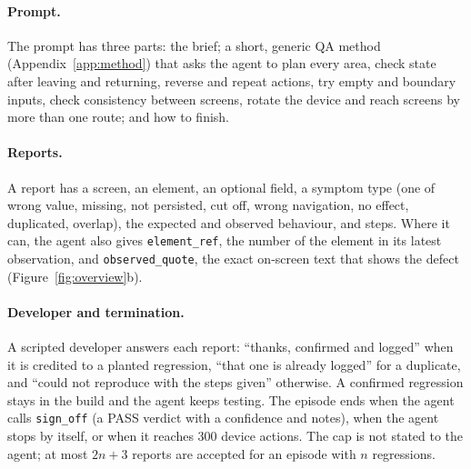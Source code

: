 \documentclass[11pt]{article}
\begin{document}
\paragraph{Prompt.} The prompt has three parts: the brief; a short, generic QA method
(Appendix~\ref{app:method}) that asks the agent to plan every area, check state after leaving and
returning, reverse and repeat actions, try empty and boundary inputs, check consistency between
screens, rotate the device and reach screens by more than one route; and how to finish.

\paragraph{Reports.} A report has a screen, an element, an optional field, a symptom type (one of
wrong value, missing, not persisted, cut off, wrong navigation, no effect, duplicated, overlap),
the expected and observed behaviour, and steps. Where it can, the agent also gives
\texttt{element\_ref}, the number of the element in its latest observation, and
\texttt{observed\_quote}, the exact on-screen text that shows the defect
(Figure~\ref{fig:overview}b).

\paragraph{Developer and termination.} A scripted developer answers each report: ``thanks,
confirmed and logged'' when it is credited to a planted regression, ``that one is already logged''
for a duplicate, and ``could not reproduce with the steps given'' otherwise. A confirmed regression
stays in the build and the agent keeps testing. The episode ends when the agent calls
\texttt{sign\_off} (a PASS verdict with a confidence and notes), when the agent stops by itself,
or when it reaches 300 device actions. The cap is not stated to the agent; at most $2n{+}3$
reports are accepted for an episode with $n$ regressions.
\end{document}
